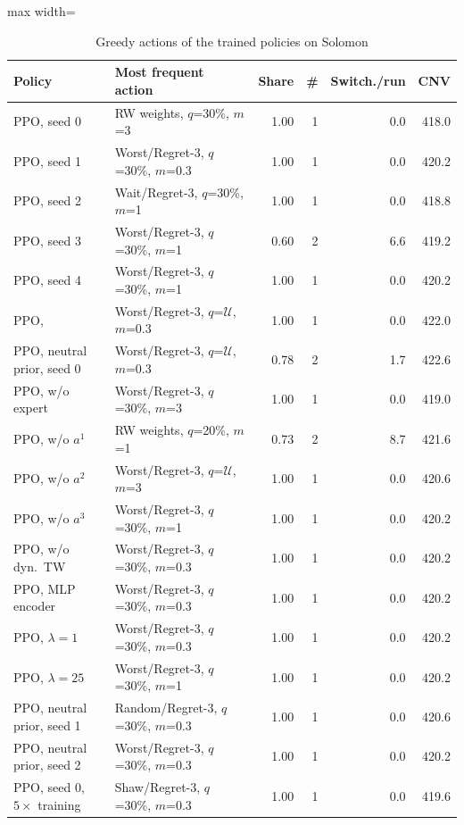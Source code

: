 \begin{table}[t]
\centering
\caption{Greedy actions of the trained policies on Solomon}\label{tab:learners}
\setlength{\tabcolsep}{2.5pt}
\begin{adjustbox}{max width=\linewidth}
\begin{tabular}{llrrrr}
\toprule
Policy & Most frequent action & Share & \# & Switch./run & CNV\\ \midrule
PPO, seed 0 & RW weights, $q$=30\%, $m$=3 & 1.00 & 1 & 0.0 & 418.0\\
PPO, seed 1 & Worst/Regret-3, $q$=30\%, $m$=0.3 & 1.00 & 1 & 0.0 & 420.2\\
PPO, seed 2 & Wait/Regret-3, $q$=30\%, $m$=1 & 1.00 & 1 & 0.0 & 418.8\\
PPO, seed 3 & Worst/Regret-3, $q$=30\%, $m$=1 & 0.60 & 2 & 6.6 & 419.2\\
PPO, seed 4 & Worst/Regret-3, $q$=30\%, $m$=1 & 1.00 & 1 & 0.0 & 420.2\\
PPO, \sgc{} & Worst/Regret-3, $q$=$\mathcal U$, $m$=0.3 & 1.00 & 1 & 0.0 & 422.0\\
PPO, neutral prior, seed 0 & Worst/Regret-3, $q$=$\mathcal U$, $m$=0.3 & 0.78 & 2 & 1.7 & 422.6\\
PPO, w/o expert & Worst/Regret-3, $q$=30\%, $m$=3 & 1.00 & 1 & 0.0 & 419.0\\
PPO, w/o $a^1$ & RW weights, $q$=20\%, $m$=1 & 0.73 & 2 & 8.7 & 421.6\\
PPO, w/o $a^2$ & Worst/Regret-3, $q$=$\mathcal U$, $m$=3 & 1.00 & 1 & 0.0 & 420.6\\
PPO, w/o $a^3$ & Worst/Regret-3, $q$=30\%, $m$=1 & 1.00 & 1 & 0.0 & 420.2\\
PPO, w/o dyn.\ TW & Worst/Regret-3, $q$=30\%, $m$=0.3 & 1.00 & 1 & 0.0 & 420.2\\
PPO, MLP encoder & Worst/Regret-3, $q$=30\%, $m$=0.3 & 1.00 & 1 & 0.0 & 420.2\\
PPO, $\lambda=1$ & Worst/Regret-3, $q$=30\%, $m$=0.3 & 1.00 & 1 & 0.0 & 420.2\\
PPO, $\lambda=25$ & Worst/Regret-3, $q$=30\%, $m$=1 & 1.00 & 1 & 0.0 & 420.2\\
PPO, neutral prior, seed 1 & Random/Regret-3, $q$=30\%, $m$=0.3 & 1.00 & 1 & 0.0 & 420.6\\
PPO, neutral prior, seed 2 & Worst/Regret-3, $q$=30\%, $m$=0.3 & 1.00 & 1 & 0.0 & 420.2\\
PPO, seed 0, $5\times$ training & Shaw/Regret-3, $q$=30\%, $m$=0.3 & 1.00 & 1 & 0.0 & 419.6\\

\end{tabular}
\end{adjustbox}
\end{table}
